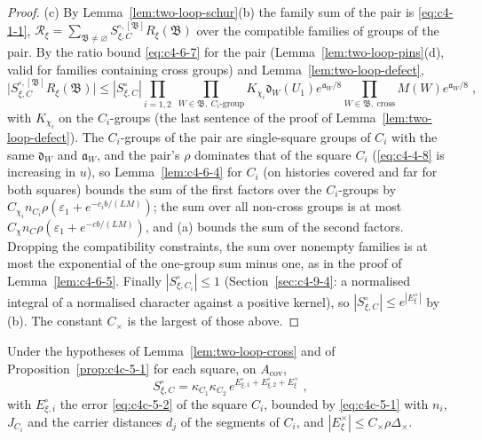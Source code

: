 \begin{proof}
(c) By Lemma~\ref{lem:two-loop-schur}(b) the family sum of the pair is \eqref{eq:c4-1-1}, $\mathscr R_\xi=\sum_{\mathfrak B\neq\varnothing}S^{\circ,[\mathfrak B]}_{\xi,C}R_\xi(\mathfrak B)$ over the compatible families of groups of the pair. By the ratio bound \eqref{eq:c4-6-7} for the pair (Lemma~\ref{lem:two-loop-pins}(d), valid for families containing cross groups) and Lemma~\ref{lem:two-loop-defect},
\[
    \bigl|S^{\circ,[\mathfrak B]}_{\xi,C}R_\xi(\mathfrak B)\bigr|\leq|S^\circ_{\xi,C}|\prod_{i=1,2}\ \prod_{W\in\mathfrak B,\ C_i\text{-group}}K_{\chi_i}\mathfrak d_W(U_1)e^{\mathfrak a_W/8}\prod_{W\in\mathfrak B,\ \text{cross}}M(W)e^{\mathfrak a_W/8}\;,
\]
with $K_{\chi_i}$ on the $C_i$-groups (the last sentence of the proof of Lemma~\ref{lem:two-loop-defect}). The $C_i$-groups of the pair are single-square groups of $C_i$ with the same $\mathfrak d_W$ and $\mathfrak a_W$, and the pair's $\rho$ dominates that of the square $C_i$ (\eqref{eq:c4-4-8} is increasing in $u$), so Lemma~\ref{lem:c4-6-4} for $C_i$ (on histories covered and far for both squares) bounds the sum of the first factors over the $C_i$-groups by $C_{\chi_i}n_{C_i}\rho(\varepsilon_1+e^{-c_ib/(LM)})$; the sum over all non-cross groups is at most $C_\chi n_C\rho(\varepsilon_1+e^{-cb/(LM)})$, and (a) bounds the sum of the second factors. Dropping the compatibility constraints, the sum over nonempty families is at most the exponential of the one-group sum minus one, as in the proof of Lemma~\ref{lem:c4-6-5}. Finally $|S^\circ_{\xi,C_i}|\leq1$ (Section~\ref{sec:c4-9-4}: a normalised integral of a normalised character against a positive kernel), so $|S^\circ_{\xi,C}|\leq e^{|E^\times_\xi|}$ by (b). The constant $C_\times$ is the largest of those above.
\end{proof}

\begin{corollary}\label{cor:two-loop-scalar}
Under the hypotheses of Lemma~\ref{lem:two-loop-cross} and of Proposition~\ref{prop:c4c-5-1} for each square, on $A_{\mathrm{cov}}$,
\begin{equation}\label{eq:two-loop-scalar}
    S^\circ_{\xi,C}=\kappa_{C_1}\kappa_{C_2}\,e^{E^\circ_{\xi,1}+E^\circ_{\xi,2}+E^\times_\xi}\;,
\end{equation}
with $E^\circ_{\xi,i}$ the error \eqref{eq:c4c-5-2} of the square $C_i$, bounded by \eqref{eq:c4c-5-1} with $n_i$, $J_{C_i}$ and the carrier distances $d_j$ of the segments of $C_i$, and $|E^\times_\xi|\leq C_\times\rho\Delta_\times$.
\end{corollary}


